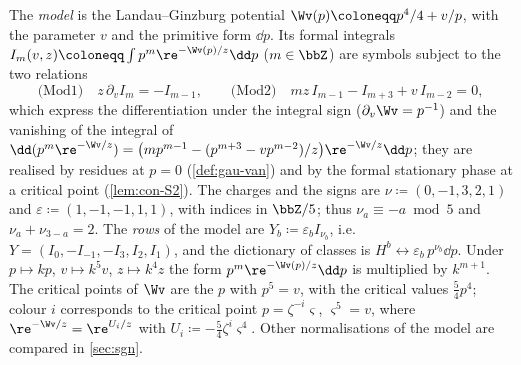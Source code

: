 \begin{defn}
\label{def:set-model}
The \emph{model} is the Landau--Ginzburg potential $\Wv(p)\coloneqq p^4/4+v/p$, with the parameter $v$ and the primitive form $\dd p$. Its formal integrals $I_m(v,z)\coloneqq\int p^m\re^{-\Wv(p)/z}\dd p$ ($m\in\bbZ$) are symbols subject to the two relations
\[
\text{(Mod1)}\quad z\,\partial_vI_m=-I_{m-1},\qquad\text{(Mod2)}\quad mz\,I_{m-1}-I_{m+3}+v\,I_{m-2}=0,
\]
which express the differentiation under the integral sign ($\partial_v\Wv=p^{-1}$) and the vanishing of the integral of $\dd(p^m\re^{-\Wv/z})=\bigl(mp^{m-1}-(p^{m+3}-vp^{m-2})/z\bigr)\re^{-\Wv/z}\dd p$; they are realised by residues at $p=0$ (\cref{def:gau-van}) and by the formal stationary phase at a critical point (\cref{lem:con-S2}). The charges and the signs are $\nu\coloneqq(0,-1,3,2,1)$ and $\varepsilon\coloneqq(1,-1,-1,1,1)$, with indices in $\bbZ/5$; thus $\nu_a\equiv-a\bmod5$ and $\nu_a+\nu_{3-a}=2$. The \emph{rows} of the model are $Y_b\coloneqq\varepsilon_bI_{\nu_b}$, i.e.\ $Y=(I_0,-I_{-1},-I_3,I_2,I_1)$, and the dictionary of classes is $H^b\leftrightarrow\varepsilon_b\,p^{\nu_b}\dd p$. Under $p\mapsto kp$, $v\mapsto k^5v$, $z\mapsto k^4z$ the form $p^m\re^{-\Wv(p)/z}\dd p$ is multiplied by $k^{m+1}$. The critical points of $\Wv$ are the $p$ with $p^5=v$, with the critical values $\frac54p^4$; colour $i$ corresponds to the critical point $p=\zeta^{-i}\varsigma$, $\varsigma^5=v$, where $\re^{-\Wv/z}=\re^{U_i/z}$ with $U_i\coloneqq-\frac54\zeta^i\varsigma^4$. Other normalisations of the model are compared in \cref{sec:sgn}.
\end{defn}

